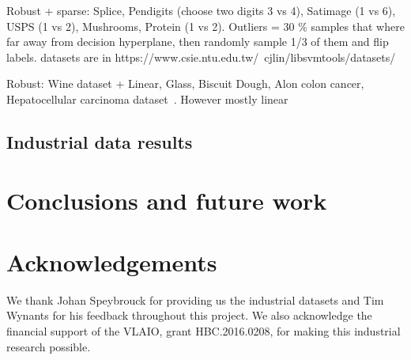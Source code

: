 \documentclass[preprint,12pt]{elsarticle}
\begin{document}
Robust + sparse: Splice, Pendigits (choose two digits 3 vs 4), Satimage (1 vs 6), USPS (1 vs 2), Mushrooms, Protein (1 vs 2).\cite{chen2018sparse}
Outliers = 30 \% samples that where far away from decision hyperplane, then randomly sample 1/3 of them and flip labels. datasets are in https://www.csie.ntu.edu.tw/~cjlin/libsvmtools/datasets/ 

Robust: Wine dataset + Linear, Glass, Biscuit Dough, Alon colon cancer, Hepatocellular carcinoma dataset~\cite{debruyne2009robustified}. However mostly linear

\subsection{Industrial data results} 

\section{Conclusions and future work}

\section*{Acknowledgements}

We thank Johan Speybrouck for providing us the industrial datasets and Tim Wynants for his feedback throughout this project. We also acknowledge the financial support of the VLAIO, grant HBC.2016.0208, for making this industrial research possible.





%





%
%
%
\end{document}
